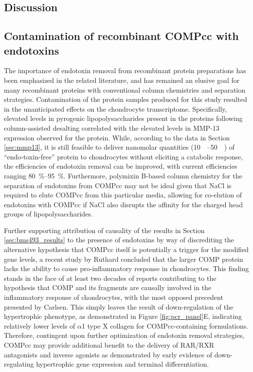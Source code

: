 \begin{refsection}
\section{Discussion}
\subsection{Contamination of recombinant COMPcc with endotoxins}
The importance of endotoxin removal from recombinant protein preparations has
been emphasized in the related literature,\cite{Petsch2000,Sengupta2010} and
has remained an elusive goal for many recombinant proteins with conventional
column chemistries and separation strategies.\cite{Chen2009,Liu1997,Ritzen2007}
Contamination of the protein samples produced for this study resulted in the
unanticipated effects on the chondrocyte transcriptome. Specifically, elevated
levels in pyrogenic lipopolysaccharides present in the proteins following
column-assisted desalting correlated with the elevated levels in MMP-13
expression observed for the protein. While, according to the data in Section
\ref{sec:mmp13}, it is still feasible to deliver nanomolar quantities
(\SIrange{10}{50}{\nano\moLar}) of ``endo-toxin-free'' protein to chondrocytes
without eliciting a catabolic response, the efficiencies of endotoxin removal
can be improved, with current efficiencies ranging \SIrange{80}{95}{\percent}.
Furthermore, polymixin B-based column chemistry for the separation of endotoxins
from COMPcc may not be ideal given that NaCl is required to elute COMPcc from this
particular media, allowing for co-elution of endotoxins with COMPcc if NaCl also
disrupts the affinity for the charged head groups of lipopolysaccharides.

Further supporting attribution of causality of the results in Section
\ref{sec:bms493_results} to the presence of endotoxins by way of discrediting
the alternative hypothesis that COMPcc itself is potentially a trigger for the
modified gene levels, a recent study by Ruthard  concluded that
the larger COMP protein lacks the ability to cause pro-inflammatory response in
chondrocytes.\cite{Ruthard2014} This finding stands in the face of at least two
decades of reports contributing to the hypothesis that COMP and its fragments
are causally involved in the inflammatory response of
chondrocytes,\cite{Lohmander1994,Vilim1997,Heinegard2011,Adams2001,Vilim2002}
with the most opposed precedent presented by Carlsen.\cite{Carlsen1998}
This simply leaves the result of down-regulation of the hypertrophic phenotype,
as demonstrated in Figure \ref{fig:pcr_panel}E, indicating relatively lower
levels of ${\alpha}$1 type X collagen for COMPcc-containing formulations.
Therefore, contingent upon further optimization of endotoxin removal strategies,
COMPcc may provide additional benefit to the delivery of RAR/RXR
antagonists and inverse agonists as demonstrated by early evidence of
down-regulating hypertrophic gene expression and terminal differentiation.


\end{refsection}
